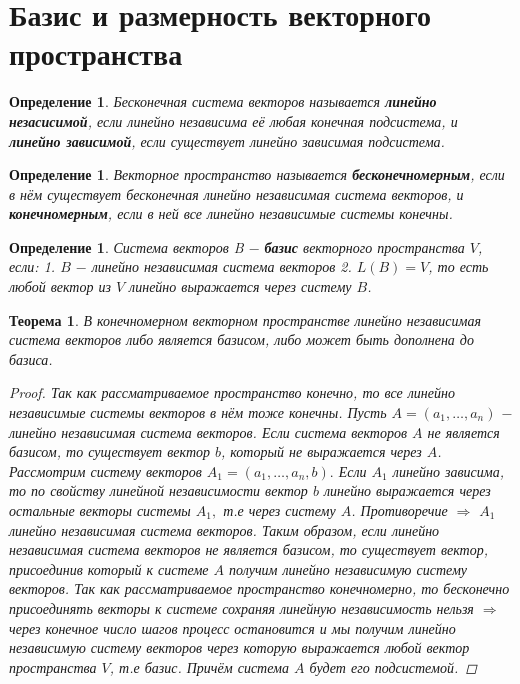 \documentclass[main.tex]{subfiles}
\begin{document}
\section{Базис и размерность векторного пространства}


\newtheorem*{Definition1}{Определение}
\begin{Definition1}
Бесконечная система векторов называется \textbf{линейно незасисимой}, если линейно независима её любая конечная подсистема, и \textbf{линейно зависимой}, если существует линейно зависимая подсистема.
\end{Definition1}


\newtheorem*{Definition2}{Определение}
\begin{Definition2}
Векторное пространство называется \textbf{бесконечномерным}, если в нём существует бесконечная линейно независимая система векторов, и \textbf{конечномерным}, если в ней все линейно независимые системы конечны.
\end{Definition2}


\newtheorem*{Definition3}{Определение}
\begin{Definition3}
\obeylines
Система векторов B $-$ \textbf{базис} векторного пространства $V$, если:
\hfill
1. $B$ $- $ линейно независимая система векторов
2. $L(B) = V$,  то есть любой вектор из $V$ линейно выражается через  систему $B$.
\end{Definition3}


\newtheorem*{t1}{Теорема}
\begin{t1}
В конечномерном векторном пространстве линейно независимая система векторов 
либо является базисом, либо может быть дополнена до базиса.
\begin{proof}
Так как рассматриваемое пространство конечно, то все линейно независимые системы векторов в нём тоже конечны.
Пусть $A = (a_{1},\dots,a_{n})$ $-$ линейно независимая система векторов. Если система векторов $A$ не является базисом, то
существует вектор $b$, который не выражается через $A$. Рассмотрим систему векторов $A_{1} = (a_{1},\dots,a_{n},b).$ 
Если $A_{1}$ линейно зависима, то по свойству линейной независимости вектор $b$ линейно выражается через остальные векторы системы $A_{1},$
т.е через систему $A$. Противоречие $\Rightarrow$ $A_{1}$ линейно независимая система векторов. Таким образом, если линейно независимая система векторов 
не является базисом, то существует вектор, присоединив который к системе $A$ получим линейно независимую систему векторов. Так как рассматриваемое пространство
конечномерно, то бесконечно присоединять векторы к системе сохраняя линейную независимость нельзя $\Rightarrow$ через конечное число шагов процесс остановится 
и мы получим линейно независимую систему векторов через которую выражается любой вектор пространства $V$, т.е базис. Причём система $A$ будет его подсистемой.
\end{proof}
\end{t1}
\end{document}
